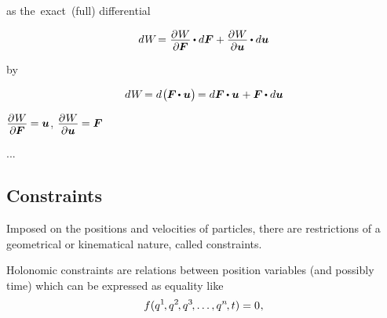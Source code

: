as the~exact~(full) differential

\nopagebreak\[
d \hspace{.1ex} W \hspace{-0.33ex}  = \hspace{.08ex} \displaystyle \frac{\raisemath{-0.2em}{\partial \hspace{.1ex} W}}{\partial \hspace{-0.1ex} \bm{F}} \hspace{-0.1ex} \dotp d \bm{F} + \frac{\raisemath{-0.2em}{\partial \hspace{.1ex} W}}{\partial \bm{u}} \hspace{-0.1ex} \dotp d \bm{u}
\]

by 

\nopagebreak\[
d \hspace{.1ex} W \hspace{-0.33ex}
= d \hspace{.15ex} \bigl( \hspace{-0.1ex} \bm{F} \hspace{-0.2ex} \dotp \bm{u} \bigr) \hspace{-0.25ex}
= d\bm{F} \hspace{-0.1ex} \dotp \bm{u} \hspace{.12ex} + \bm{F} \hspace{-0.1ex} \dotp d\bm{u}
\]

${\displaystyle \frac{\raisemath{-0.2em}{\partial \hspace{.1ex} W}}{\partial \hspace{-0.1ex} \bm{F}} \hspace{-0.1ex} = \bm{u}}$,
${\displaystyle \frac{\raisemath{-0.2em}{\partial \hspace{.1ex} W}}{\partial \bm{u}} \hspace{-0.1ex} = \bm{F}}$

...

\subsection*{Constraints}

Imposed on the positions and velocities of particles, there are restrictions of a geometrical or kinematical nature, called constraints.

Holonomic constraints are relations between position variables (and possibly time) which can be expressed as equality like
\begin{equation*}
f(q^{1} \hspace{-0.25ex}, q^{2} \hspace{-0.25ex}, q^{3} \hspace{-0.25ex}, \ldots, q^{n} \hspace{-0.25ex}, t) = 0
\hspace{.1ex} ,
\end{equation*}

